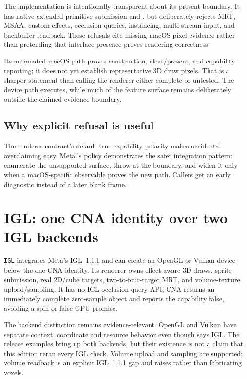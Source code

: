 The implementation is intentionally transparent about its present boundary.  It has native
extended primitive submission and , but deliberately rejects MRT,
MSAA, custom effects, occlusion queries, instancing, multi-stream input, and backbuffer
readback.  These refusals cite missing macOS pixel evidence rather than pretending that
interface presence proves rendering correctness.

Its automated macOS path proves construction, clear/present, and capability reporting; it
does not yet establish representative 3D draw pixels.  That is a sharper statement than
calling the renderer either complete or untested.  The device path executes, while much of
the feature surface remains deliberately outside the claimed evidence boundary.

\subsection{Why explicit refusal is useful}

The renderer contract's default-true capability polarity makes accidental overclaiming easy.
Metal's policy demonstrates the safer integration pattern: enumerate the unsupported surface,
throw at the boundary, and widen it only when a macOS-specific observable proves the new path.
Callers get an early diagnostic instead of a later blank frame.

\section{IGL: one CNA identity over two IGL backends}

\texttt{IGL} integrates Meta's IGL~1.1.1 and can create an OpenGL or Vulkan device below the one
CNA identity. Its renderer owns effect-aware 3D draws, sprite submission, real 2D/cube targets,
two-to-four-target MRT, and volume-texture upload/sampling. It has no IGL occlusion-query API;
CNA returns an immediately complete zero-sample object and reports the capability false, avoiding
a spin or false GPU promise.

The backend distinction remains evidence-relevant. OpenGL and Vulkan have separate context,
coordinate and resource behavior even though  says IGL. The
release examples bring up both backends, but their existence is not a claim that this edition
reran every IGL check. Volume upload and sampling are supported; volume readback is an explicit
IGL~1.1.1 gap and raises rather than fabricating voxels.

